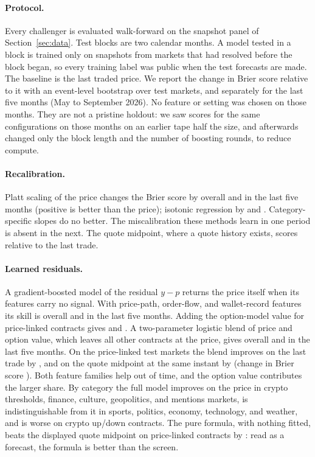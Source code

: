 \paragraph{Protocol.} Every challenger is evaluated walk-forward on the snapshot panel of Section~\ref{sec:data}. Test blocks are two calendar months. A model tested in a block is trained only on snapshots from markets that had resolved before the block began, so every training label was public when the test forecasts are made. The baseline is the last traded price. We report the change in Brier score relative to it with an event-level bootstrap over \modelTestMarkets{} test markets, and separately for the last five months (May to September 2026). No feature or setting was chosen on those months. They are not a pristine holdout: we saw scores for the same configurations on those months on an earlier tape half the size, and afterwards changed only the block length and the number of boosting rounds, to reduce compute.

\paragraph{Recalibration.} Platt scaling of the price changes the Brier score by \skillPlattAll{} overall and \skillPlattHold{} in the last five months (positive is better than the price); isotonic regression by \skillIsotonicAll{} and \skillIsotonicHold{}. Category-specific slopes do no better. The miscalibration these methods learn in one period is absent in the next. The quote midpoint, where a quote history exists, scores \skillMidAll{} relative to the last trade.

\paragraph{Learned residuals.} A gradient-boosted model of the residual $y-p$ returns the price itself when its features carry no signal. With price-path, order-flow, and wallet-record features its skill is \skillResFlowAll{} overall and \skillResFlowHold{} in the last five months. Adding the option-model value for price-linked contracts gives \skillResFullAll{} and \skillResFullHold{}. A two-parameter logistic blend of price and option value, which leaves all other contracts at the price, gives \skillBlendAll{} overall and \skillBlendHold{} in the last five months. On the \plMarkets{} price-linked test markets the blend improves on the last trade by \plSkillBlend{}, and on the quote midpoint at the same instant by \plMidBlend{} (change in Brier score \plMidBlendCI{}). Both feature families help out of time, and the option value contributes the larger share. By category the full model improves on the price in crypto thresholds, finance, culture, geopolitics, and mentions markets, is indistinguishable from it in sports, politics, economy, technology, and weather, and is worse on crypto up/down contracts. The pure formula, with nothing fitted, beats the displayed quote midpoint on price-linked contracts by \plMidFair{}: read as a forecast, the formula is better than the screen.

